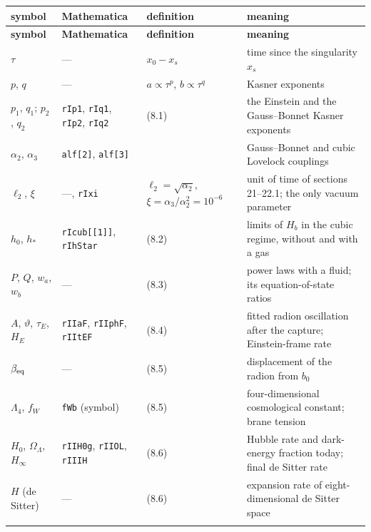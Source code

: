 \documentclass[10pt,a4paper]{article}
\begin{document}
{\small
\begin{longtable}{>{\raggedright\arraybackslash}p{}>{\raggedright\arraybackslash}p{}>{\raggedright\arraybackslash}p{}>{\raggedright\arraybackslash}p{}}
\toprule
\textbf{symbol} & \textbf{Mathematica} & \textbf{definition} & \textbf{meaning} \\
\midrule\endfirsthead
\toprule
\textbf{symbol} & \textbf{Mathematica} & \textbf{definition} & \textbf{meaning} \\
\midrule\endhead
\endfoot
\bottomrule\endlastfoot
$\tau$ & — & $x_0-x_s$ & time since the singularity $x_s$ \\
$p$, $q$ & — & $a\propto\tau^p$, $b\propto\tau^q$ & Kasner exponents \\
$p_1$, $q_1$; $p_2$, $q_2$ & \texttt{rIp1}, \texttt{rIq1}, \texttt{rIp2}, \texttt{rIq2} & (8.1) & the Einstein and the Gauss–Bonnet Kasner exponents \\
$\alpha_2$, $\alpha_3$ & \texttt{alf[2]}, \texttt{alf[3]} &  & Gauss–Bonnet and cubic Lovelock couplings \\
$\ell_2$, $\xi$ & —, \texttt{rIxi} & $\ell_2=\sqrt{\alpha_2}$, $\xi=\alpha_3/\alpha_2^2=10^{-6}$ & unit of time of sections 21–22.1; the only vacuum parameter \\
$h_0$, $h_*$ & \texttt{rIcub[[1]]}, \texttt{rIhStar} & (8.2) & limits of $H_b$ in the cubic regime, without and with a gas \\
$P$, $Q$, $w_a$, $w_b$ & — & (8.3) & power laws with a fluid; its equation-of-state ratios \\
$A$, $\vartheta$, $\tau_E$, $H_E$ & \texttt{rIIaF}, \texttt{rIIphF}, \texttt{rIItEF} & (8.4) & fitted radion oscillation after the capture; Einstein-frame rate \\
$\beta_{\rm eq}$ & — & (8.5) & displacement of the radion from $b_0$ \\
$\Lambda_4$, $f_W$ & \texttt{fWb} (symbol) & (8.5) & four-dimensional cosmological constant; brane tension \\
$H_0$, $\Omega_\Lambda$, $H_\infty$ & \texttt{rIIH0g}, \texttt{rIIOL}, \texttt{rIIIH} & (8.6) & Hubble rate and dark-energy fraction today; final de Sitter rate \\
$H$ (de Sitter) & — & (8.6) & expansion rate of eight-dimensional de Sitter space \\*
\end{longtable}}
\end{document}

